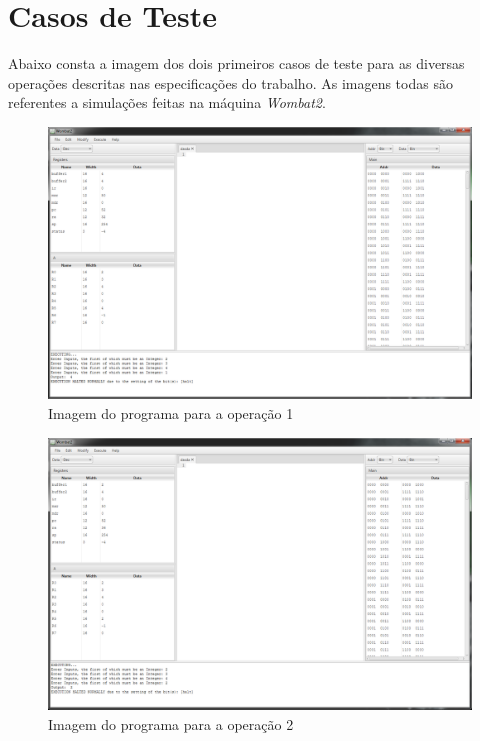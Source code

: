 \documentclass{article}
\begin{document}
\section{Casos de Teste}

Abaixo consta a imagem dos dois primeiros casos de teste para as diversas operações descritas nas especificações do trabalho. As imagens todas são referentes a simulações feitas na máquina \textit{Wombat2}.

\begin{figure}[h!]
\centering
\includegraphics[scale=0.34]{1.png}
\caption{Imagem do programa para a operação 1}
\label{fig:ibagem1}
\end{figure}

\begin{figure}[h!]
\centering
\includegraphics[scale=0.34]{2.png}
\caption{Imagem do programa para a operação 2}
\label{fig:ibagem2}
\end{figure}
\end{document}
